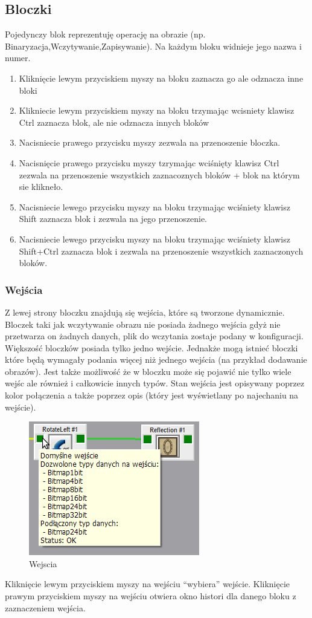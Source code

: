 \documentclass[a4paper,10pt]{article}
\begin{document}
\subsection{Bloczki}
Pojedynczy blok reprezentuję operację na obrazie (np. Binaryzacja,Wczytywanie,Zapisywanie). Na każdym bloku widnieje jego nazwa i numer.
\begin{enumerate}
 \item Kliknięcie lewym przyciskiem myszy na bloku zaznacza go ale odznacza inne bloki
 \item Klikniecie lewym przyciskiem myszy na bloku trzymając wcisniety klawisz Ctrl zaznacza blok, ale nie odznacza innych bloków
 \item Nacisniecie prawego przycisku myszy zezwala na przenoszenie bloczka.
 \item Nacisnięcie prawego przycisku myszy tzrymając wciśnięty klawisz Ctrl zezwala na przenoszenie wszystkich zaznacoznych bloków + blok na którym sie klikneło.
 \item Nacisniecie lewego przycisku myszy na bloku trzymając wciśniety klawisz Shift zaznacza blok i zezwala na jego przenoszenie.
 \item Nacisniecie lewego przycisku myszy na bloku trzymając wciśniety klawisz Shift+Ctrl zaznacza blok i zezwala na przenoszenie wszystkich zaznaczonych bloków.
\end{enumerate}

\subsubsection{Wejścia}
Z lewej strony bloczku znajdują się wejścia, które są tworzone dynamicznie. Bloczek taki jak wczytywanie obrazu nie posiada żadnego wejścia gdyż nie przetwarza on żadnych danych, plik do wczytania zostaje podany w konfiguracji. Większość bloczków posiada tylko jedno wejście. Jednakże mogą istnieć bloczki które będą wymagały podania więcej niż jednego wejścia (na przykład dodawanie obrazów). Jest także możliwość że w bloczku może się pojawić nie tylko wiele wejśc ale również i całkowicie innych typów.
Stan wejścia jest opisywany poprzez kolor połączenia a także poprzez opis (który jest wyświetlany po najechaniu na wejście).
\begin{figure}[h]
 \centering
 \includegraphics[scale=0.5]{wejscia}
 \caption{Wejscia}
 \label{fig:Input}
\end{figure}
Kliknięcie lewym przyciskiem myszy na wejściu ``wybiera'' wejście.
Kliknięcie prawym przyciskiem myszy na wejściu otwiera okno histori dla danego bloku z zaznaczeniem wejścia.
\end{document}
